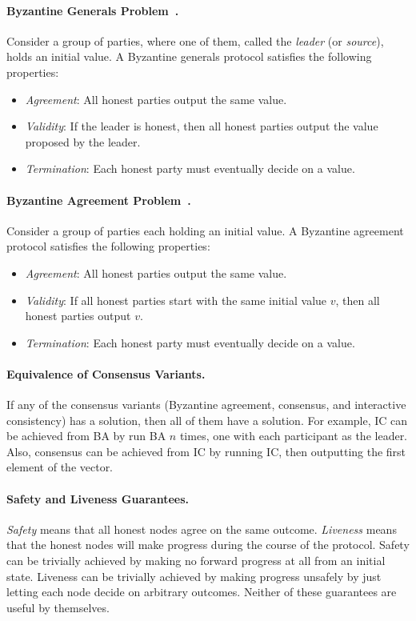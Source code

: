 \documentclass[11pt]{article}
\theoremstyle{mytheoremstyle}
\begin{document}
\paragraph{Byzantine Generals Problem~\cite{lsp82}.} Consider a group of parties, where one of them, called the \emph{leader} (or \emph{source}), holds an initial value. A Byzantine generals protocol satisfies the following properties:
\begin{itemize}
	\item \emph{Agreement}: All honest parties output the same value. 
	\item \emph{Validity}: If the leader is honest, then all honest parties output the value proposed by the leader.
	\item \emph{Termination}: Each honest party must eventually decide on a value.
\end{itemize}

\paragraph{Byzantine Agreement Problem~\cite{lsp82}.} Consider a group of parties each holding an initial value. A Byzantine agreement protocol satisfies the following properties:
\begin{itemize}
	\item \emph{Agreement}: All honest parties output the same value. 
	\item \emph{Validity}: If all honest parties start with the same initial value $v$, then all honest parties output $v$.
	\item \emph{Termination}: Each honest party must eventually decide on a value.
\end{itemize}

\paragraph{Equivalence of Consensus Variants.} If any of the consensus variants (Byzantine agreement, consensus, and interactive consistency) has a solution, then all of them have a solution. For example, IC can be achieved from BA by run BA $n$ times, one with each participant as the leader. Also, consensus can be achieved from IC by running IC, then outputting the first element of the vector.

\paragraph{Safety and Liveness Guarantees.} \emph{Safety} means that all honest nodes agree on the same outcome. \emph{Liveness} means that the honest nodes will make progress during the course of the protocol. Safety can be trivially achieved by making no forward progress at all from an initial state. Liveness can be trivially achieved by making progress unsafely by just letting each node decide on arbitrary outcomes. Neither of these guarantees are useful by themselves.
\end{document}

